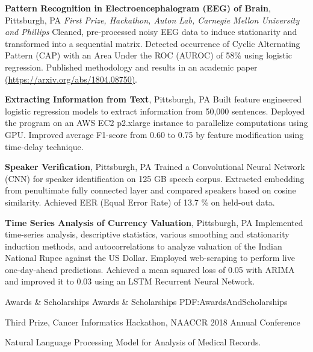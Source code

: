 \documentclass[letterpaper,MMMyyyy,nonstopmode]{simpleresumecv}
\begin{document}
\begin{Body}
\BigGap
\Entry
{\textbf{Pattern Recognition in Electroencephalogram (EEG) of Brain}},
Pittsburgh, PA
\hfill
{}
\Entry
\textit{First Prize, Hackathon, Auton Lab, Carnegie Mellon University and Phillips}
\BulletItem
Cleaned, pre-processed noisy EEG data to induce stationarity and transformed into a sequential matrix.
\BulletItem
Detected occurrence of Cyclic Alternating Pattern (CAP) with an Area Under the ROC (AUROC) of 58\% using logistic regression.
\BulletItem
Published methodology and results in an academic paper {\href{https://arxiv.org/abs/1804.08750}{ (https://arxiv.org/abs/1804.08750)}}.

\BigGap
\Entry
{\textbf{Extracting Information from Text}},
Pittsburgh, PA
\hfill
{}
\BulletItem
Built feature engineered logistic regression models to extract information from 50,000 sentences. 
\BulletItem
Deployed the program on an AWS EC2 p2.xlarge instance to parallelize computations using GPU.
\BulletItem
Improved average F1-score from 0.60 to 0.75 by feature modification using time-delay technique.

\BigGap
\Entry
{\textbf{Speaker Verification}},
Pittsburgh, PA
\hfill
{}
\BulletItem
Trained a Convolutional Neural Network (CNN) for speaker identification on 125 GB speech corpus.
\BulletItem
Extracted embedding from penultimate fully connected layer and compared speakers based on cosine similarity.
\BulletItem
Achieved EER (Equal Error Rate) of 13.7 \% on held-out data.

\BigGap
\Entry
{\textbf{Time Series Analysis of Currency Valuation}},
Pittsburgh, PA
\hfill
{}
\BulletItem
Implemented time-series analysis, descriptive statistics, various smoothing and stationarity induction methods, and autocorrelations to analyze valuation of the Indian National Rupee against the US Dollar.
\BulletItem
Employed web-scraping to perform live one-day-ahead predictions.
\BulletItem
Achieved a mean squared loss of 0.05 with ARIMA and improved it to 0.03 using an LSTM Recurrent Neural Network.


\Section
{Awards \&\newline
Scholarships}
{Awards \& Scholarships}
{PDF:AwardsAndScholarships}

\BulletItem
Third Prize,
Cancer Informatics Hackathon,
NAACCR 2018 Annual Conference
\hfill
{}
\begin{Detail}
\Item
Natural Language Processing Model for Analysis of Medical Records.
\end{Detail}


\end{Body}
\end{document}
